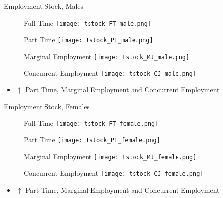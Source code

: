 \documentclass[hyperref={bookmarks=false}]{beamer}
\let\oldcite=\cite
\renewcommand{\cite}[1]{\textcolor[rgb]{.0,.2,.7}{\oldcite{#1}}}
\begin{document}
\begin{appendix}
\begin{frame}{Employment Stock, Males}
\begin{figure}[!t]
\centering
\begin{minipage}[b]{0.4\textwidth}{Full Time}
\centering
\texttt{[image: tstock\_FT\_male.png]}
\end{minipage}
\begin{minipage}[b]{0.4\textwidth}{Part Time}
\centering
\texttt{[image: tstock\_PT\_male.png]}
\end{minipage}
\begin{minipage}[b]{0.4\textwidth}{Marginal Employment}
\centering
\texttt{[image: tstock\_MJ\_male.png]}
\end{minipage}
\begin{minipage}[b]{0.4\textwidth}{Concurrent Employment}
\centering
\texttt{[image: tstock\_CJ\_male.png]}
\end{minipage}
\end{figure}
\begin{itemize}
\setlength{\itemsep}{0.7 cm}
\item $\uparrow$ Part Time, Marginal Employment and Concurrent Employment \cite{CarriTuRo15} 
\end{itemize}
\end{frame}

\begin{frame}{Employment Stock, Females}
\begin{figure}[!t]
\centering
\begin{minipage}[b]{0.4\textwidth}{Full Time}
\centering
\texttt{[image: tstock\_FT\_female.png]}
\end{minipage}
\begin{minipage}[b]{0.4\textwidth}{Part Time}
\centering
\texttt{[image: tstock\_PT\_female.png]}
\end{minipage}
\begin{minipage}[b]{0.4\textwidth}{Marginal Employment}
\centering
\texttt{[image: tstock\_MJ\_female.png]}
\end{minipage}
\begin{minipage}[b]{0.4\textwidth}{Concurrent Employment}
\centering
\texttt{[image: tstock\_CJ\_female.png]}
\end{minipage}
\end{figure}
\begin{itemize}
\setlength{\itemsep}{0.7 cm}
\item $\uparrow$ Part Time, Marginal Employment and Concurrent Employment \cite{CarriTuRo15} 
\end{itemize}
\end{frame}


\end{appendix}
\end{document}
